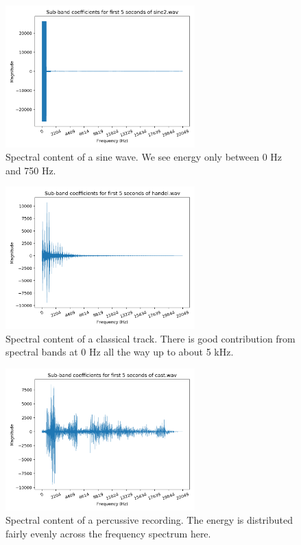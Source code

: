\documentclass[11pt,a4paper]{article}
\begin{document}
\begin{figure}[ht]
	\centering
	\includegraphics[width=0.65\textwidth]{analysis/sine2}
	\caption{Spectral content of a sine wave. We see energy only between 0 Hz and 750 Hz.}
	\label{fig:analysis_sine2}
\end{figure}

\clearpage

\begin{figure}[ht]
	\centering
	\includegraphics[width=0.65\textwidth]{analysis/handel}
	\caption{Spectral content of a classical track. There is good contribution from spectral bands at 0 Hz all the way up to about 5 kHz.}
	\label{fig:analysis_handel}
\end{figure}

\begin{figure}[ht]
	\centering
	\includegraphics[width=0.65\textwidth]{analysis/cast}
	\caption{Spectral content of a percussive recording. The energy is distributed fairly evenly across the frequency spectrum here.}
	\label{fig:analysis_cast}
\end{figure}
\end{document}
